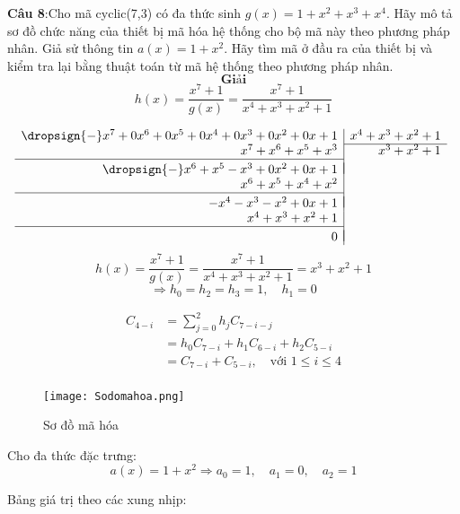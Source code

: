 \documentclass[12pt]{article}
\begin{document}
\newpage
\textbf{Câu 8}:Cho mã cyclic(7,3) có đa thức sinh $g(x)=1+x^2+x^3+x^4$. Hãy mô tả sơ đồ chức năng của thiết bị mã hóa hệ thống cho bộ mã này theo phương pháp nhân. Giả sử thông tin $a(x)=1+x^2$. Hãy tìm mã ở đầu ra của thiết bị và kiểm tra lại bằng thuật toán từ mã hệ thống theo phương pháp nhân.
\[
\textbf{Giải}
\]
\[
h(x) = \frac{x^7 + 1}{g(x)} = \frac{x^7 + 1}{x^4 + x^3 + x^2 + 1}
\]

\[
  \begin{array}{r|r}
    \dropsign{-} x^7 + 0x^6 + 0x^5 + 0x^4 + 0x^3 + 0x^2 + 0x + 1 & x^4 + x^3 + x^2 + 1 \\ \cline{2-2}
    x^7 + x^6 + x^5 + x^3 & x^3 + x^2 + 1 \\ \cline{1-1} \\[\dimexpr-\normalbaselineskip+\jot]
    \dropsign{-} x^6 + x^5 - x^3 + 0x^2 + 0x + 1 \\
                 x^6 + x^5 + x^4 + x^2 & \\ \cline{1-1} \\[\dimexpr-\normalbaselineskip+\jot]
                - x^4 - x^3 - x^2 + 0x + 1 \\
                x^4 + x^3 + x^2 + 1 \\ \cline{1-1} \\[\dimexpr-\normalbaselineskip+\jot]
                      0
  \end{array}
\
\]
\[
h(x) = \frac{x^7 + 1}{g(x)} = \frac{x^7 + 1}{x^4 + x^3 + x^2 + 1} = x^3 + x^2 + 1
\]
\[
\Rightarrow h_0 = h_2 = h_3 = 1,\quad h_1 = 0
\]

\[
\begin{aligned}
C_{4 - i} &= \sum_{j=0}^{2} h_j C_{7 - i - j} \\
         &= h_0 C_{7 - i} + h_1 C_{6 - i} + h_2 C_{5 - i} \\
         &= C_{7 - i} + C_{5 - i}, \quad \text{với } 1 \leq i \leq 4
\end{aligned}         
\]
\[
\begin{aligned}
\end{aligned}
\]

\begin{figure}[H] %
    \centering
    \texttt{[image: Sodomahoa.png]}
    \caption{Sơ đồ mã hóa}
    \label{fig:enter-label}
\end{figure}

Cho đa thức đặc trưng:
\[
a(x) = 1 + x^2 \Rightarrow a_0 = 1, \quad a_1 = 0, \quad a_2 = 1
\]

Bảng giá trị theo các xung nhịp:
\end{document}
